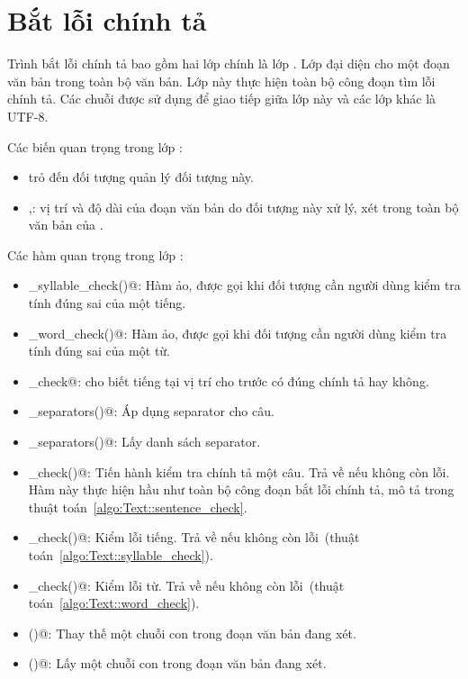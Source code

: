 \documentclass[a4paper,oneside,14pt]{extbook} %
\begin{document}
\section{Bắt lỗi chính tả}

Trình bắt lỗi chính tả bao gồm hai lớp chính là lớp \verb@Text@. Lớp
\verb@Text@ đại diện cho một đoạn văn bản trong toàn bộ văn bản. Lớp
này thực hiện toàn bộ công đoạn tìm lỗi chính tả. Các chuỗi được sử
dụng để giao tiếp giữa lớp này và các lớp khác là UTF-8.

Các biến quan trọng trong lớp \verb@Text@:
\begin{itemize}
\item \verb@vspell@ trỏ đến đối tượng \verb@VSpell@ quản lý đối tượng
  này.
\item \verb@offset@,\verb@length@: vị trí và độ dài của đoạn văn bản
  do đối tượng này xử lý, xét trong toàn bộ văn bản của \verb@vspell@.
\end{itemize}

Các hàm quan trọng trong lớp \verb@Text@:
\begin{itemize}
\item \verb@ui_syllable_check()@: Hàm ảo, được gọi khi đối tượng cần
  người dùng kiểm tra tính đúng sai của một tiếng.
\item \verb@ui_word_check()@: Hàm ảo, được gọi khi đối tượng cần người
  dùng kiểm tra tính đúng sai của một từ.
\item \verb@syllabel_check@: cho biết tiếng tại vị trí cho trước có
  đúng chính tả hay không.
\item \verb@apply_separators()@: Áp dụng separator cho câu.
\item \verb@get_separators()@: Lấy danh sách separator.
\item \verb@sentence_check()@: Tiến hành kiểm tra chính tả một
  câu. Trả về \verb@true@ nếu không còn lỗi. Hàm này thực hiện hầu như
  toàn bộ công đoạn bắt lỗi chính tả, mô tả trong thuật
  toán~\ref{algo:Text::sentence_check}.
\item \verb@syllable_check()@: Kiểm lỗi tiếng. Trả về \verb@true@ nếu
  không còn lỗi~(thuật toán~\ref{algo:Text::syllable_check}).
\item \verb@word_check()@: Kiểm lỗi từ. Trả về \verb@true@ nếu
  không còn lỗi~(thuật toán~\ref{algo:Text::word_check}).
\item \verb@replace()@: Thay thế một chuỗi con trong đoạn văn bản đang
  xét.
\item \verb@substr()@: Lấy một chuỗi con trong đoạn văn bản đang xét.
\end{itemize}
\end{document}
